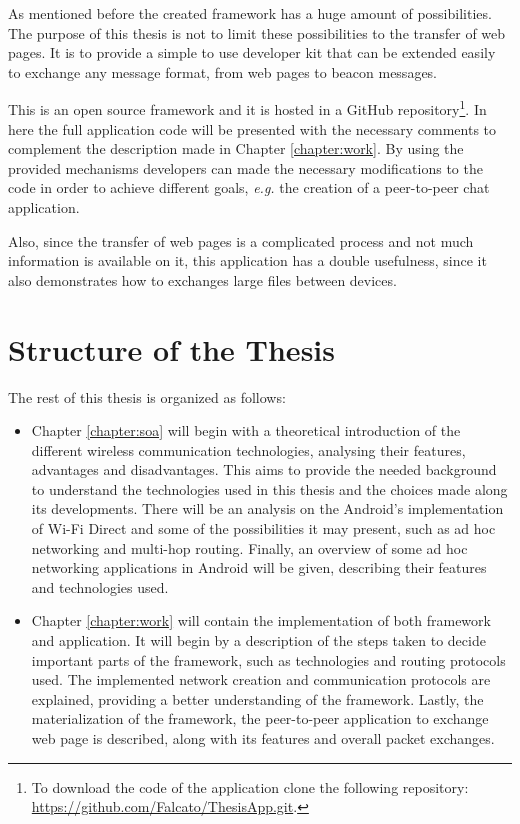 As mentioned before the created framework has a huge amount of possibilities. The purpose of this thesis is not to limit these possibilities to the transfer of web pages. It is to provide a simple to use developer kit that can be extended easily to exchange any message format, from web pages to beacon messages.

This is an open source framework and it is hosted in a GitHub repository\footnote{To download the code of the application clone the following repository: \url{https://github.com/Falcato/ThesisApp.git}.}. In here the full application code will be presented with the necessary comments to complement the description made in Chapter \ref{chapter:work}. By using the provided mechanisms developers can made the necessary modifications to the code in order to achieve different goals, \textit{e.g.} the creation of a peer-to-peer chat application.

Also, since the transfer of web pages is a complicated process and not much information is available on it, this application has a double usefulness, since it also demonstrates how to exchanges large files between devices.

\section{Structure of the Thesis}

The rest of this thesis is organized as follows:

\begin{itemize}
	\item Chapter \ref{chapter:soa} will begin with a theoretical introduction of the different wireless communication technologies, analysing their features, advantages and disadvantages. This aims to provide the needed background to understand the technologies used in this thesis and the choices made along its developments. There will be an analysis on the Android's implementation of Wi-Fi Direct and some of the possibilities it may present, such as ad hoc networking and multi-hop routing. Finally, an overview of some ad hoc networking applications in Android will be given, describing their features and technologies used.
	
	\item Chapter \ref{chapter:work} will contain the implementation of both framework and application. It will begin by a description of the steps taken to decide important parts of the framework, such as technologies and routing protocols used. The implemented network creation and communication protocols are explained, providing a better understanding of the framework. Lastly, the materialization of the framework, the peer-to-peer application to exchange web page is described, along with its features and overall packet exchanges.
	
	
\end{itemize}










